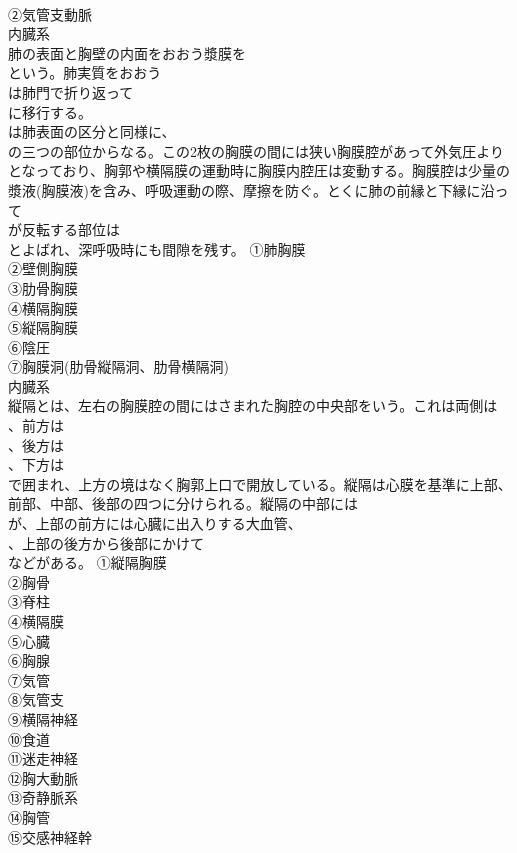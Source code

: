 \documentclass[8pt]{extreport}
\begin{document}
\begin{CJK}{UTF8}{min}
\\	②気管支動脈
\\	内臓系
\\	肺の表面と胸壁の内面をおおう漿膜を
\\	という。肺実質をおおう
\\	は肺門で折り返って
\\	に移行する。
\\	は肺表面の区分と同様に、
\\	の三つの部位からなる。この2枚の胸膜の間には狭い胸膜腔があって外気圧より
\\	となっており、胸郭や横隔膜の運動時に胸膜内腔圧は変動する。胸膜腔は少量の漿液(胸膜液)を含み、呼吸運動の際、摩擦を防ぐ。とくに肺の前縁と下縁に沿って
\\	が反転する部位は
\\	とよばれ、深呼吸時にも間隙を残す。	①肺胸膜
\\	②壁側胸膜
\\	③肋骨胸膜
\\	④横隔胸膜
\\	⑤縦隔胸膜
\\	⑥陰圧
\\	⑦胸膜洞(肋骨縦隔洞、肋骨横隔洞)
\\	内臓系
\\	縦隔とは、左右の胸膜腔の間にはさまれた胸腔の中央部をいう。これは両側は
\\	、前方は
\\	、後方は
\\	、下方は
\\	で囲まれ、上方の境はなく胸郭上口で開放している。縦隔は心膜を基準に上部、前部、中部、後部の四つに分けられる。縦隔の中部には
\\	が、上部の前方には心臓に出入りする大血管、
\\	、上部の後方から後部にかけて
\\	などがある。	①縦隔胸膜
\\	②胸骨
\\	③脊柱
\\	④横隔膜
\\	⑤心臓
\\	⑥胸腺
\\	⑦気管
\\	⑧気管支
\\	⑨横隔神経
\\	⑩食道
\\	⑪迷走神経
\\	⑫胸大動脈
\\	⑬奇静脈系
\\	⑭胸管
\\	⑮交感神経幹

\end{CJK}
\end{document}
